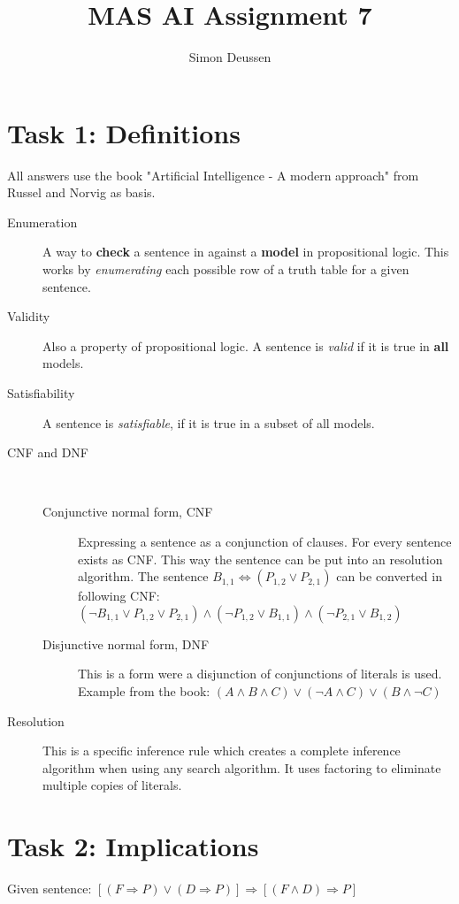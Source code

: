 \documentclass{article}
\title{MAS AI Assignment 7}
\author{Simon Deussen}
\begin{document}
\maketitle
{}

\section*{Task 1: Definitions}
All answers use the book "Artificial Intelligence - A modern approach" from Russel and Norvig as basis.

\begin{description}
  \item[Enumeration] A way to \textbf{check} a sentence in against a \textbf{model} in propositional logic. This works by \emph{enumerating} each possible row of a truth table for a given sentence.
  \item[Validity] Also a property of propositional logic. A sentence is \emph{valid} if it is true in \textbf{all} models.
  \item[Satisfiability] A sentence is \emph{satisfiable}, if it is true in a subset of all models. 
  \item[CNF and DNF] \ \begin{description}
    \item[Conjunctive normal form, CNF]  Expressing a sentence as a conjunction of clauses. For every sentence exists as CNF.  This way the sentence can be put into an resolution algorithm. The sentence $B_{1,1} \Leftrightarrow (P_{1,2} \vee  P_{2,1})$ can be converted in following CNF: $(\neg B_{1,1} \vee P_{1,2} \vee P_{2,1}) \wedge (\neg P_{1,2} \vee B_{1,1}) \wedge (\neg P_{2,1} \vee B_{1,2})$
    \item[Disjunctive normal form, DNF] This is a form were a disjunction of conjunctions of literals is used. Example from the book: $(A \wedge B \wedge C) \vee (\neg A \wedge C) \vee (B \wedge \neg C)$
  \end{description}
  \item[Resolution] This is a specific inference rule which creates a complete inference algorithm when using any search algorithm. It uses factoring to eliminate multiple copies of literals.
\end{description}

\section*{Task 2: Implications}
Given sentence: $[(F \Longrightarrow P) \vee (D \Longrightarrow P)] \Longrightarrow [(F \wedge D) \Longrightarrow P]$
\end{document}

